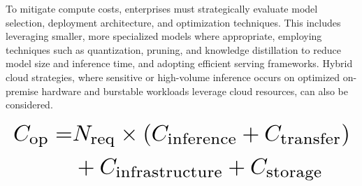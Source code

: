 \documentclass{article}
\begin{document}
To mitigate compute costs, enterprises must strategically evaluate model selection, deployment architecture, and optimization techniques. This includes leveraging smaller, more specialized models where appropriate, employing techniques such as quantization, pruning, and knowledge distillation to reduce model size and inference time, and adopting efficient serving frameworks. Hybrid cloud strategies, where sensitive or high-volume inference occurs on optimized on-premise hardware and burstable workloads leverage cloud resources, can also be considered.












































\begin{equation}
\resizebox{\columnwidth}{!}{$\displaystyle
\begin{aligned}
C_{\text{op}} = & N_{\text{req}} \times (C_{\text{inference}} + C_{\text{transfer}}) \\
& + C_{\text{infrastructure}} + C_{\text{storage}}
\end{aligned}
$}
\end{equation}
\end{document}
